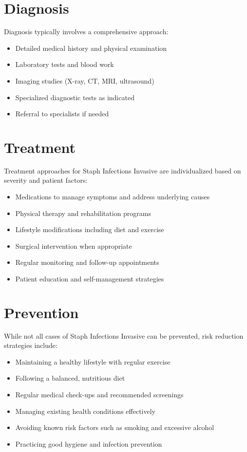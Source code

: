 \section*{Diagnosis}
Diagnosis typically involves a comprehensive approach:

\begin{itemize}
\item Detailed medical history and physical examination
\item Laboratory tests and blood work
\item Imaging studies (X-ray, CT, MRI, ultrasound)
\item Specialized diagnostic tests as indicated
\item Referral to specialists if needed
\end{itemize}

\section*{Treatment}
Treatment approaches for Staph Infections Invasive are individualized based on severity and patient factors:

\begin{itemize}
\item Medications to manage symptoms and address underlying causes
\item Physical therapy and rehabilitation programs
\item Lifestyle modifications including diet and exercise
\item Surgical intervention when appropriate
\item Regular monitoring and follow-up appointments
\item Patient education and self-management strategies
\end{itemize}

\section*{Prevention}
While not all cases of Staph Infections Invasive can be prevented, risk reduction strategies include:

\begin{itemize}
\item Maintaining a healthy lifestyle with regular exercise
\item Following a balanced, nutritious diet
\item Regular medical check-ups and recommended screenings
\item Managing existing health conditions effectively
\item Avoiding known risk factors such as smoking and excessive alcohol
\item Practicing good hygiene and infection prevention
\end{itemize}

